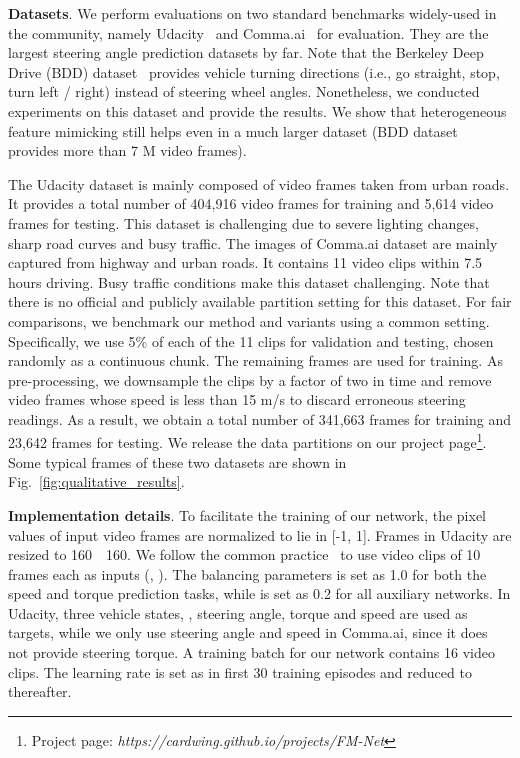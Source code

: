 

\noindent\textbf{Datasets}. We perform evaluations on two standard benchmarks widely-used in the community, namely Udacity~\cite{udacity} and Comma.ai~\cite{santana2016learning} for evaluation.
They are the largest steering angle prediction datasets by far. Note that the Berkeley Deep Drive (BDD) dataset~\cite{yu2018bdd100k} provides vehicle turning directions (i.e., go straight, stop, turn left / right) instead of steering wheel angles. Nonetheless, we conducted experiments on this dataset and provide the results. We show that heterogeneous feature mimicking still helps even in a much larger dataset (BDD dataset provides more than 7 M video frames).

The Udacity dataset is mainly composed of video frames taken from urban roads. It provides a total number of 404,916 video frames for training and 5,614 video frames for testing. This dataset is challenging due to severe lighting changes, sharp road curves and busy traffic.
The images of Comma.ai dataset are mainly captured from highway and urban roads. It contains 11 video clips within 7.5 hours driving. Busy traffic conditions make this dataset challenging.
Note that there is no official and publicly available partition setting for this dataset. For fair comparisons, we benchmark our method and variants using a common setting. Specifically, we use 5\% of each of the 11 clips for validation and testing, chosen randomly as a continuous chunk. The remaining frames are used for training. As pre-processing, we downsample the clips by a factor of two in time and remove video frames whose speed is less than 15 m/s to discard erroneous steering readings. As a result, we obtain a total number of 341,663 frames for training and 23,642 frames for testing. We release the data partitions on our project page\footnote{Project page: \emph{https://cardwing.github.io/projects/FM-Net}}.
Some typical frames of these two datasets are shown in Fig.~\ref{fig:qualitative_results}.



\vspace{0.1cm}
\noindent\textbf{Implementation details}. To facilitate the training of our network, the pixel values of input video frames are normalized to lie in [-1, 1]. Frames in Udacity are resized to 160~~160.
We follow the common practice~\cite{udacity} to use video clips of 10 frames each as inputs (\ie, ).
The balancing parameters  is set as 1.0 for both the speed and torque prediction tasks, while  is set as 0.2 for all auxiliary networks.
In Udacity, three vehicle states, \ie, steering angle, torque and speed are used as targets, while we only use steering angle and speed in Comma.ai, since it does not provide steering torque.
A training batch for our network contains 16 video clips. The learning rate is set as  in first 30 training episodes and reduced to  thereafter.











